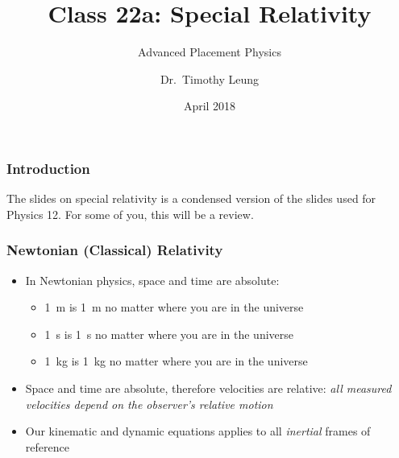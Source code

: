 \documentclass[12pt,compress,aspectratio=169]{beamer}
\title{Class 22a: Special Relativity}
\subtitle{Advanced Placement Physics}
\author[TML]{Dr.\ Timothy Leung}
\institute{Olympiads School}
\date{April 2018}
\begin{document}
\begin{frame}
  \maketitle
\end{frame}


\begin{frame}
  \frametitle{Introduction}
  The slides on special relativity is a condensed version of the slides used
  for Physics 12. For some of you, this will be a review.
\end{frame}

%
%
%



\begin{frame}
  \frametitle{Newtonian (Classical) Relativity}
  \begin{itemize}
  \item In Newtonian physics, space and time are absolute:
    \begin{itemize}
    \item \SI{1}{m} is \SI{1}{m} no matter where you are in the universe
    \item \SI{1}{s} is \SI{1}{s} no matter where you are in the universe
    \item \SI{1}{kg} is \SI{1}{kg} no matter where you are in the universe
    \end{itemize}
  \item Space and time are absolute, therefore velocities are relative:
    \emph{all measured velocities depend on the observer's relative motion}
  \item Our kinematic and dynamic equations applies to all \emph{inertial}
    frames of reference
  \end{itemize}
\end{frame}
\end{document}
